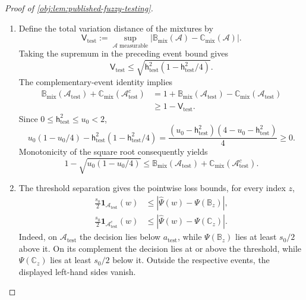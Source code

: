 \begin{proof}[Proof of \cref{obj:lem:published-fuzzy-testing}]
\begin{enumerate}
\item Define the total variation distance of the mixtures by
\[
\mathsf V_{\mathrm{test}}
:=\sup_{\mathcal A\text{ measurable}}
|\mathbb B_{\mathrm{mix}}(\mathcal A)
-\mathbb C_{\mathrm{mix}}(\mathcal A)|.
\]
Taking the supremum in the preceding event bound gives
\[
\mathsf V_{\mathrm{test}}
\le
\sqrt{\mathsf h_{\mathrm{test}}^2
                   (1-\mathsf h_{\mathrm{test}}^2/4)}.
\]
The complementary-event identity implies
\[
\begin{aligned}
\mathbb B_{\mathrm{mix}}(\mathcal A_{\mathrm{test}})
+\mathbb C_{\mathrm{mix}}(\mathcal A_{\mathrm{test}}^c)
&=1+\mathbb B_{\mathrm{mix}}(\mathcal A_{\mathrm{test}})
       -\mathbb C_{\mathrm{mix}}(\mathcal A_{\mathrm{test}})\\
&\ge 1-\mathsf V_{\mathrm{test}}.
\end{aligned}
\]
Since \(0\le\mathsf h_{\mathrm{test}}^2\le u_0<2\),
\[
u_0(1-u_0/4)
-\mathsf h_{\mathrm{test}}^2(1-\mathsf h_{\mathrm{test}}^2/4)
=
\frac{(u_0-\mathsf h_{\mathrm{test}}^2)
      (4-u_0-\mathsf h_{\mathrm{test}}^2)}{4}
\ge0.
\]
Monotonicity of the square root consequently yields
\[
1-\sqrt{u_0(1-u_0/4)}
\le
\mathbb B_{\mathrm{mix}}(\mathcal A_{\mathrm{test}})
+\mathbb C_{\mathrm{mix}}(\mathcal A_{\mathrm{test}}^c).
\]

\item The threshold separation gives the pointwise loss bounds, for every index \(z\),
\[
\begin{aligned}
\frac{s_0}{2}\mathbf 1_{\mathcal A_{\mathrm{test}}}(w)
&\le|\widehat\Psi(w)-\Psi(\mathbb B_z)|,\\
\frac{s_0}{2}\mathbf 1_{\mathcal A_{\mathrm{test}}^c}(w)
&\le|\widehat\Psi(w)-\Psi(\mathbb C_z)|.
\end{aligned}
\]
Indeed, on \(\mathcal A_{\mathrm{test}}\) the decision lies below
\(a_{\mathrm{test}}\), while \(\Psi(\mathbb B_z)\) lies at least \(s_0/2\)
above it. On its complement the decision lies at or above the threshold,
while \(\Psi(\mathbb C_z)\) lies at least \(s_0/2\) below it. Outside the
respective events, the displayed left-hand sides vanish.


\end{enumerate}
\end{proof}
